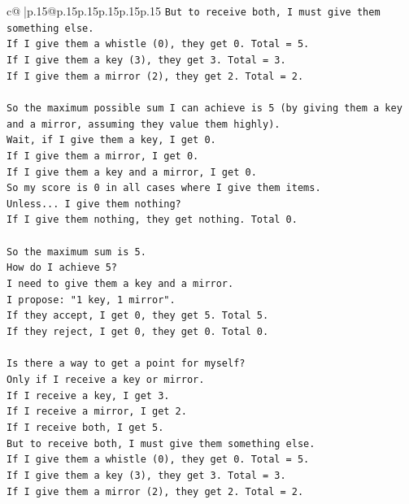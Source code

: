 \documentclass{article}
\begin{document}
{\begin{supertabular}{c@{$\;$}|p{.15\linewidth}@{}p{.15\linewidth}p{.15\linewidth}p{.15\linewidth}p{.15\linewidth}p{.15\linewidth}}
{{{\texttt{But to receive both, I must give them something else.} \\
\texttt{If I give them a whistle (0), they get 0. Total = 5.} \\
\texttt{If I give them a key (3), they get 3. Total = 3.} \\
\texttt{If I give them a mirror (2), they get 2. Total = 2.} \\
\\ 
\texttt{So the maximum possible sum I can achieve is 5 (by giving them a key and a mirror, assuming they value them highly).} \\
\texttt{Wait, if I give them a key, I get 0.} \\
\texttt{If I give them a mirror, I get 0.} \\
\texttt{If I give them a key and a mirror, I get 0.} \\
\texttt{So my score is 0 in all cases where I give them items.} \\
\texttt{Unless... I give them nothing?} \\
\texttt{If I give them nothing, they get nothing. Total 0.} \\
\\ 
\texttt{So the maximum sum is 5.} \\
\texttt{How do I achieve 5?} \\
\texttt{I need to give them a key and a mirror.} \\
\texttt{I propose: "1 key, 1 mirror".} \\
\texttt{If they accept, I get 0, they get 5. Total 5.} \\
\texttt{If they reject, I get 0, they get 0. Total 0.} \\
\\ 
\texttt{Is there a way to get a point for myself?} \\
\texttt{Only if I receive a key or mirror.} \\
\texttt{If I receive a key, I get 3.} \\
\texttt{If I receive a mirror, I get 2.} \\
\texttt{If I receive both, I get 5.} \\
\texttt{But to receive both, I must give them something else.} \\
\texttt{If I give them a whistle (0), they get 0. Total = 5.} \\
\texttt{If I give them a key (3), they get 3. Total = 3.} \\
\texttt{If I give them a mirror (2), they get 2. Total = 2.} \\
}}}
\end{supertabular}}
\end{document}
